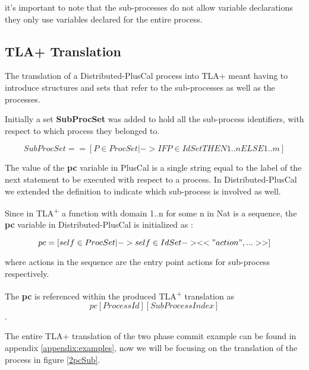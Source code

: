 \documentclass{thesul}
\newcommand{\tlaplus}{TLA\textsuperscript{+}\xspace}
\begin{document}
it's important to note that the sub-processes do not allow variable declarations they only use variables declared for the entire process.

\subsection{TLA+ Translation}

The translation of a Distributed-PlusCal process into TLA+ meant having to introduce structures and sets that refer to the sub-processes as well as the processes.

Initially a set \textbf{SubProcSet} was added to hold all the sub-process identifiers, with respect to which process they belonged to.

\[
SubProcSet == [P \in ProcSet |-> IF P \in IdSet  THEN  1..n
								  ELSE  1..m ]
\]						  

The value of the \textbf{pc} variable in PlusCal is a single string equal to the label of the next statement to be executed with respect to a process. In Distributed-PlusCal we extended the definition to indicate which sub-process is involved as well.

Since in \tlaplus a function with domain 1..n for some n in Nat is a sequence, the \textbf{pc} variable in Distributed-PlusCal is initialized as :

\[
pc = [self \in ProcSet |-> self \in IdSet -> <<"action",...>>]
\]	

where actions in the sequence are the entry point actions for sub-process respectively. 

The \textbf{pc} is referenced within the produced \tlaplus translation as \[ pc[Process Id][SubProcess Index] \].
		  
The entire TLA+ translation of the two phase commit example can be found in appendix \ref{appendix:examples}, now we will be focusing on the translation of the process in figure \ref{2pcSub}.
\end{document}
